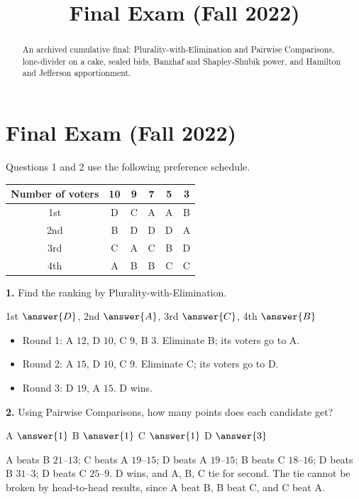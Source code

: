 \documentclass[12pt]{ximera}
\title{Final Exam (Fall 2022)}
\begin{document}
\begin{abstract}
An archived cumulative final: Plurality-with-Elimination and Pairwise Comparisons, lone-divider on a cake, sealed bids, Banzhaf and Shapley-Shubik power, and Hamilton and Jefferson apportionment.
\end{abstract}
\maketitle

\section*{Final Exam (Fall 2022)}

\begin{problem}
Questions 1 and 2 use the following preference schedule.
\begin{center}
\begin{tabular}{c|ccccc}
Number of voters & 10 & 9 & 7 & 5 & 3\\\hline
1st & D & C & A & A & B\\
2nd & B & D & D & D & A\\
3rd & C & A & C & B & D\\
4th & A & B & B & C & C
\end{tabular}
\end{center}

\begin{prompt}
\textbf{1.} Find the ranking by Plurality-with-Elimination.

1st $\answer{D}$, 2nd $\answer{A}$, 3rd $\answer{C}$, 4th $\answer{B}$
\begin{feedback}
\begin{itemize}
\item Round 1: A $12$, D $10$, C $9$, B $3$. Eliminate B; its voters go to A.
\item Round 2: A $15$, D $10$, C $9$. Eliminate C; its voters go to D.
\item Round 3: D $19$, A $15$. D wins.
\end{itemize}
\end{feedback}
\end{prompt}

\begin{prompt}
\textbf{2.} Using Pairwise Comparisons, how many points does each candidate get?

A $\answer{1}$ \quad B $\answer{1}$ \quad C $\answer{1}$ \quad D $\answer{3}$
\begin{feedback}
A beats B $21$--$13$; C beats A $19$--$15$; D beats A $19$--$15$; B beats C $18$--$16$;
D beats B $31$--$3$; D beats C $25$--$9$. D wins, and A, B, C tie for second. The tie
cannot be broken by head-to-head results, since A beat B, B beat C, and C beat A.
\end{feedback}
\end{prompt}
\end{problem}
\end{document}
